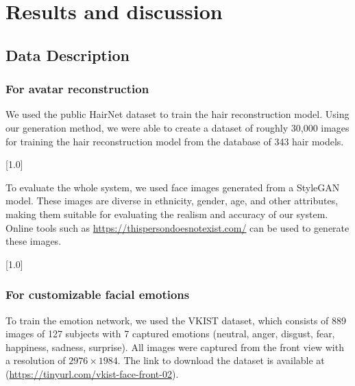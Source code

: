 \section{Results and discussion}\label{sec:results}


\subsection{Data Description}
\subsubsection{For avatar reconstruction}

We used the public HairNet dataset \cite{zhouHairNetSingleViewHair2018} to train the hair reconstruction model. Using our generation method, we were able to create a dataset of roughly 30,000 images for training the hair reconstruction model from the database of 343 hair models.

[1.0]

\label{sec:results/stylegan-dataset}
To evaluate the whole system, we used face images generated from a StyleGAN \cite{karrasStyleBasedGeneratorArchitecture2019} model. These images are diverse in ethnicity, gender, age, and other attributes, making them suitable for evaluating the realism and accuracy of our system. Online tools such as \url{https://thispersondoesnotexist.com/} can be used to generate these images.

[1.0]

\subsubsection{For customizable facial emotions}
To train the emotion network, we used the VKIST dataset, which consists of 889 images of 127 subjects with 7 captured emotions (neutral, anger, disgust, fear, happiness, sadness, surprise). All images were captured from the front view with a resolution of $2976\times1984$. The link to download the dataset is available at (\url{https://tinyurl.com/vkist-face-front-02}).

